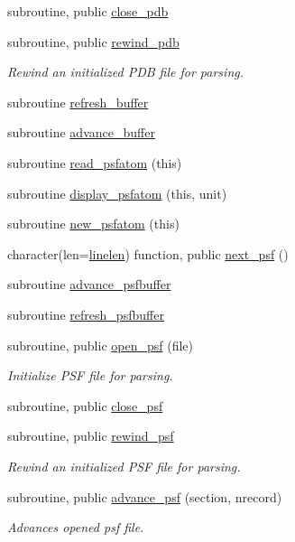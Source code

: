 \begin{DoxyCompactItemize}
subroutine, public \hyperlink{namespacemolreader_a5aafbdb9b4afbb96bdc20ae58d547699}{close\+\_\+pdb}
\item 
subroutine, public \hyperlink{namespacemolreader_af85c66302e278af03e0cc94dc42e662e}{rewind\+\_\+pdb}
\begin{DoxyCompactList}\small\item\em Rewind an initialized P\+DB file for parsing. \end{DoxyCompactList}\item 
subroutine \hyperlink{namespacemolreader_a16d4776fded57cf8aa38f639610cad84}{refresh\+\_\+buffer}
\item 
subroutine \hyperlink{namespacemolreader_ac7b950f165e89b12ccc8fff1c0f3bae9}{advance\+\_\+buffer}
\item 
subroutine \hyperlink{namespacemolreader_a81fcc5a3f49380ccd10b02b229f5067d}{read\+\_\+psfatom} (this)
\item 
subroutine \hyperlink{namespacemolreader_a737dbe023a6cbecab8269981ffdfa31c}{display\+\_\+psfatom} (this, unit)
\item 
subroutine \hyperlink{namespacemolreader_a56968311293e3c68022fe3bbe3600306}{new\+\_\+psfatom} (this)
\item 
character(len=\hyperlink{namespacemolreader_acd493d996a1fcd0ed77937e925c9b7fe}{linelen}) function, public \hyperlink{namespacemolreader_ac6b85a406b7ebd0810f0d63beeeda783}{next\+\_\+psf} ()
\item 
subroutine \hyperlink{namespacemolreader_abf243c87d2f9429f3ed94293d438c7c7}{advance\+\_\+psfbuffer}
\item 
subroutine \hyperlink{namespacemolreader_a13131c46b34d0385ba7eadd0b1b88df9}{refresh\+\_\+psfbuffer}
\item 
subroutine, public \hyperlink{namespacemolreader_a3ebd81391f00e3279bf262b2879af97a}{open\+\_\+psf} (file)
\begin{DoxyCompactList}\small\item\em Initialize P\+SF file for parsing. \end{DoxyCompactList}\item 
subroutine, public \hyperlink{namespacemolreader_aac446b95d6c274d93e11e45286e60e4d}{close\+\_\+psf}
\item 
subroutine, public \hyperlink{namespacemolreader_a6d79c8d97fd91cfb25dec2b67320c77b}{rewind\+\_\+psf}
\begin{DoxyCompactList}\small\item\em Rewind an initialized P\+SF file for parsing. \end{DoxyCompactList}\item 
subroutine, public \hyperlink{namespacemolreader_a7a4cb6436916cd4b8ee0341d528e9c73}{advance\+\_\+psf} (section, nrecord)
\begin{DoxyCompactList}\small\item\em Advances opened psf file. \end{DoxyCompactList}\end{DoxyCompactItemize}
